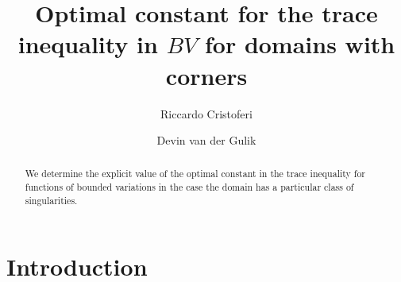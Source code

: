 \documentclass[artcle, 11pt, reqno]{amsart}
\title{Optimal constant for the trace inequality in {$BV$} for domains with corners}
\author{Riccardo Cristoferi}
\author{Devin van der Gulik}
\numberwithin{equation}{section}
\newcommand{\R}{\mathbb{R}}
\DeclareMathOperator{\Tr}{Tr}
\theoremstyle{plain}
\theoremstyle{definition}
\theoremstyle{remark}
\begin{document}
	
	\maketitle
	
	\begin{abstract}
		We determine the explicit value of the optimal constant in the trace inequality for functions of bounded variations in the case the domain has a particular class of singularities.
	\end{abstract}
	
	\section{Introduction}

	
\end{document}
